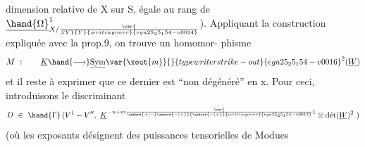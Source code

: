 dimension relative de X sur S, égale au rang de $\underline{\hand{\Omega}}^{1}_{X/\var{\over{S}{Y}}{Y}{writing over}{ega25_25_154-v0014}}$).  Appliquant la
construction expliquée avec la prop.9\hand{$^{*}$}, on trouve  un homomor-%
phisme
\[ M\ : \qquad \underline{K} \hand{\longrightarrow} \underline{\mathrm{Sym}}\var{\xout{m}}{}{typewriter strike-out}{ega25_25_154-v0016}^{2}(\underline{W}) \]
et il reste à exprimer que ce dernier est ``non dégénéré'' en x. Pour ceci,
introduisons le  discriminant
\[ D\ \in\ \hand{\Gamma}\,(V^1-V'',\ \underline{K}^{-n+m\var{\over{\unsure{+|-}}{\unsure{-|+}}}{\unsure{-|+}}{writing over}{ega25_25_154-v0017}1}\otimes \text{dét}(\underline{W})^{2}\ ) \]
(où les exposants désignent des puissances tensorielles de Modues

